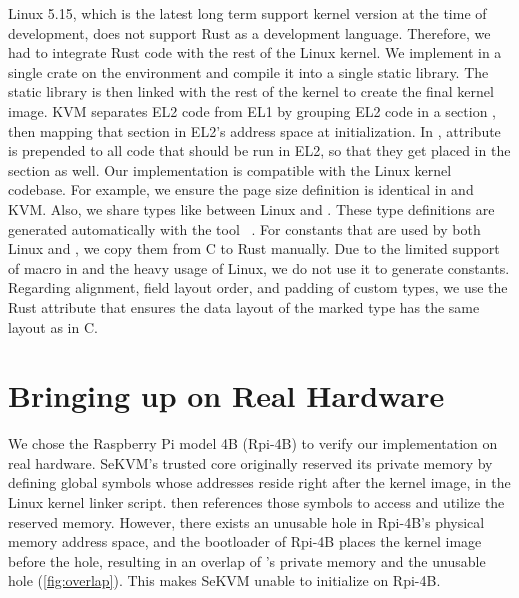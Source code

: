 Linux 5.15, which is the latest long term support kernel version at the time of
\rustsec{} development, does not support Rust as a development language.
Therefore, we had to integrate Rust code with the rest of the Linux kernel.
We implement \rustcore{} in a single crate on the  environment
and compile it into a single static library. The static library is then linked
with the rest of the kernel to create the final kernel image.
KVM separates EL2 code from EL1 by grouping EL2 code in a section
, then mapping that section in EL2's address space at
initialization.
In \rustcore{}, attribute \code{\#[link\_section = ".hyp.text"]} is prepended
to all code that should be run in EL2, so that they get placed in the
 section as well.
Our implementation is compatible with the Linux kernel codebase. For example, we
ensure the page size definition is identical in \rustcore{} and KVM.
Also, we share types like  between Linux and \rustcore{}.
These type definitions are generated automatically
with the tool ~\cite{bindgen}.
For constants that are used by both Linux and \rustcore{},
we copy them from C to Rust manually.
Due to the limited support of macro in 
and the heavy usage of Linux,
we do not use it to generate constants.
Regarding alignment, field layout order, and padding of custom types,
we use the Rust attribute \code{\#[repr\-(C)]}
that ensures the data layout of the marked type has the same layout as in C.

\section{Bringing up \rustsec{} on Real Hardware}

We chose the Raspberry Pi model 4B (Rpi-4B) to verify our implementation on
real hardware.
SeKVM's trusted core \secore{} originally reserved its private memory by
defining global symbols whose addresses reside right after the kernel image,
in the Linux kernel linker script.
\secore{} then references those symbols to access and utilize the reserved
memory.
However, there exists an unusable hole in Rpi-4B's physical memory address
space, and the bootloader of Rpi-4B places the kernel image before the hole,
resulting in an overlap of \secore{}'s private memory and the unusable hole
(\autoref{fig:overlap}). This makes SeKVM unable to initialize on Rpi-4B.

